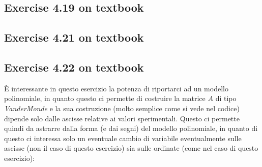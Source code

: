 \subsection{Exercise 4.19 on textbook}
\label{subsec:exercise419}


\subsection{Exercise 4.21 on textbook}
\label{subsec:exercise421}


\subsection{Exercise 4.22 on textbook}
\label{subsec:exercise422}
\`E interessante in questo esercizio la potenza di riportarci ad un modello
polinomiale, in quanto questo ci permette di costruire la matrice $A$ di tipo
\emph{VanderMonde} e la sua costruzione (molto semplice come si vede nel
codice) dipende solo dalle ascisse relative ai valori sperimentali. Questo ci
permette quindi da astrarre dalla forma (e dai segni) del modello polinomiale,
in quanto di questo ci interessa solo un eventuale cambio di variabile
eventualmente sulle ascisse (non il caso di questo esercizio) sia sulle ordinate
(come nel caso di questo esercizio):

